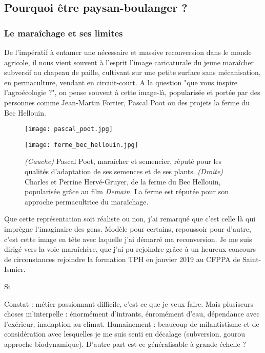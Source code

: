 \documentclass{book}
\begin{document}
\subsection{Pourquoi être paysan-boulanger ?}

\subsubsection{Le maraîchage et ses limites}

De l'impératif à entamer une nécessaire et massive reconversion dans le monde agricole, il nous vient souvent à l'esprit l'image caricaturale du jeune maraîcher subversif au chapeau de paille, cultivant sur une petite surface sans mécanisation, en permaculture, vendant en circuit-court. A la question "que vous inspire l'agroécologie ?", on pense souvent à cette image-là, popularisée et portée par des personnes comme Jean-Martin Fortier, Pascal Poot ou des projets la ferme du Bec Hellouin. 

\begin{figure}[h!]
\centering
\begin{minipage}{.5\textwidth}
  \centering
  \texttt{[image: pascal\_poot.jpg]}
  \label{fig:test1}
\end{minipage}%
\begin{minipage}{.5\textwidth}
  \centering
  \texttt{[image: ferme\_bec\_hellouin.jpg]}
  \label{fig:test2}
\end{minipage}
\caption{\textit{(Gauche)} Pascal Poot, maraîcher et semencier, réputé pour les qualités d'adaptation de ses semences et de ses plants. \textit{(Droite)} Charles et Perrine Hervé-Gruyer, de la ferme du Bec Hellouin, popularisée grâce au film \textit{Demain}. La ferme est réputée pour son approche permacultrice du maraîchage.}
\label{fig:test}
\end{figure}

Que cette représentation soit réaliste ou non, j'ai remarqué que c'est celle là qui imprègne l'imaginaire des gens. Modèle pour certains, repoussoir pour d'autre, c'est  cette image en tête avec laquelle j'ai démarré ma reconversion. Je me suis dirigé vers la voie maraîchère, que j'ai pu rejoindre grâce à un heureux concours de circonstances rejoindre la formation TPH en janvier 2019 au CFPPA de Saint-Ismier. 

Si 

Constat : métier passionnant difficile, c'est ce que je veux faire. Mais plusiseurs choses m'interpelle : énormément d'intrants, énromément d'eau, dépendance avec l'exérieur, inadaption au climat. Humainement : beaucoup de milantistisme et de considération avec lesquelles je me suis senti en décalage (subversion,  gourou approche biodynamique). D'autre part est-ce généralisable à grande échelle ? 
\end{document}
